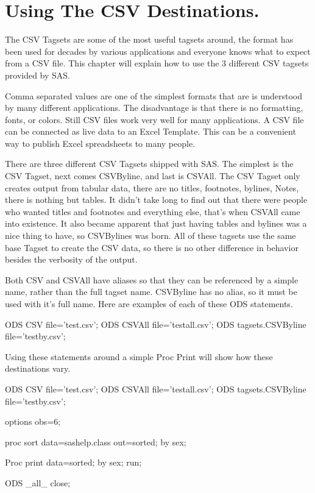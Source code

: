 \chapter{Using The CSV Destinations.}
The CSV Tagsets are some of the most useful tagsets around,
the format has been used for decades by various applications
and everyone knows what to expect from a CSV file.  This chapter
will explain how to use the 3 different CSV tagsets provided by SAS.

Comma separated values are one of the simplest formats that are
is understood by many different applications.  The disadvantage is that
there is no formatting, fonts, or colors.  Still CSV files work
very well for many applications.  A CSV file can be connected as
live data to an Excel Template.  This can be a convenient way to
publish Excel spreadsheets to many people.  

There are three different CSV Tagsets shipped with SAS.  The
simplest is the CSV Tagset, next comes CSVByline, and last
is CSVAll.  The CSV Tagset only creates output from tabular
data, there are no titles, footnotes, bylines, Notes, there
is nothing but tables.  It didn't take long to find out that
there were people who wanted titles and footnotes and everything
else, that's when CSVAll came into existence.  It also became
apparent that just having tables and bylines was a nice thing to
have, so CSVBylines was born.  All of these tagsets use the same
base Tagset to create the CSV data, so there is no other difference
in behavior besides the verbosity of the output.

Both CSV and CSVAll have aliases so that they can be referenced by
a simple name, rather than the full tagset name.  CSVByline has no
alias, so it must be used with it's full name.  Here are examples
of each of these ODS statements.

\begin{sfvcode}
ODS CSV file='test.csv';
ODS CSVAll file='testall.csv';
ODS tagsets.CSVByline file='testby.csv';
\end{sfvcode}

Using these statements around a simple Proc Print will show how
these destinations vary.

\begin{sfvcode}
ODS CSV file='test.csv';
ODS CSVAll file='testall.csv';
ODS tagsets.CSVByline file='testby.csv';

options obs=6;

proc sort data=sashelp.class out=sorted;
     by sex;

Proc print data=sorted;
     by sex;
run;

ODS _all_ close;
\end{sfvcode}

